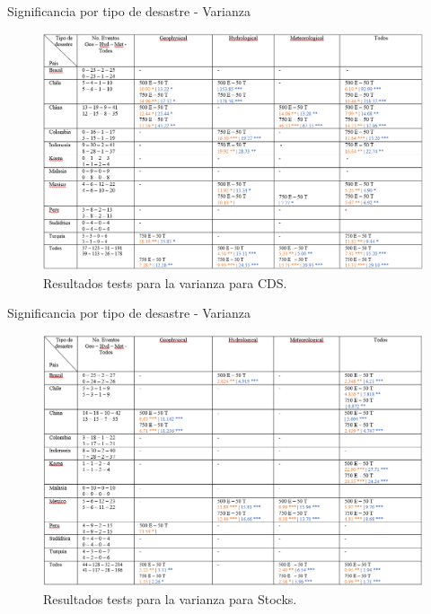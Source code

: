 \documentclass{beamer}
\begin{document}
\begin{frame}{Significancia por tipo de desastre - Varianza}
    \begin{figure}
        \includegraphics[width=0.9\linewidth]{../Graficos_Paper/Tablas/Varianza_CDS.png}
        \caption{Resultados tests para la varianza para CDS.}
    \end{figure}
\end{frame}

\begin{frame}{Significancia por tipo de desastre - Varianza}
    \begin{figure}
        \includegraphics[width=0.9\linewidth]{../Graficos_Paper/Tablas/Varianza_Stocks.png}
        \caption{Resultados tests para la varianza para Stocks.}
    \end{figure}
\end{frame}
\end{document}
